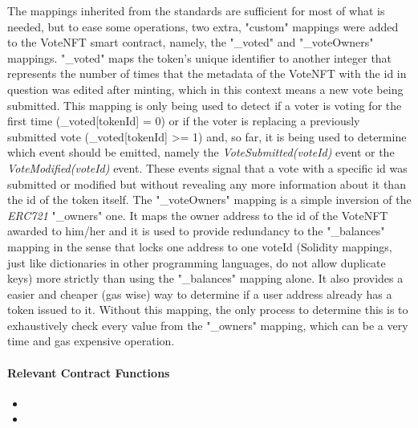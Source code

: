 \documentclass[../main.tex]{subfiles}
\begin{document}
The mappings inherited from the standards are sufficient for most of what is needed, but to ease some operations, two extra, "custom" mappings were added to the VoteNFT smart contract, namely, the "\_voted" and "\_voteOwners" mappings. "\_voted" maps the token's unique identifier to another integer that represents the number of times that the metadata of the VoteNFT with the id in question was edited after minting, which in this context means a new vote being submitted. This mapping is only being used to detect if a voter is voting for the first time (\_voted[tokenId] = 0) or if the voter is replacing a previously submitted vote (\_voted[tokenId] >= 1) and, so far, it is being used to determine which event should be emitted, namely the \textit{VoteSubmitted(voteId)} event or the \textit{VoteModified(voteId)} event. These events signal that a vote with a specific id was submitted or modified but without revealing any more information about it than the id of the token itself. The "\_voteOwners" mapping is a simple inversion of the \textit{ERC721} "\_owners" one. It maps the owner address to the id of the VoteNFT awarded to him/her and it is used to provide redundancy to the "\_balances" mapping in the sense that locks one address to one voteId (Solidity mappings, just like dictionaries in other programming languages, do not allow duplicate keys) more strictly than using the "\_balances" mapping alone. It also provides a easier and cheaper (gas wise) way to determine if a user address already has a token issued to it. Without this mapping, the only process to determine this is to exhaustively check every value from the "\_owners" mapping, which can be a very time and gas expensive operation.


\paragraph{Relevant Contract Functions}

\begin{itemize}
    \item {}
    \item {}
\end{itemize}


\end{document}
